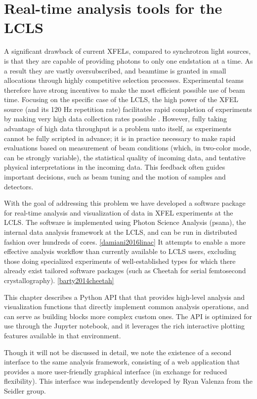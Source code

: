 \chapter{Real-time analysis tools for the LCLS}
\label{xap}

A significant drawback of current XFELs, compared to synchrotron light sources, is that they are capable of providing photons to only one endstation at a time. As a result they are vastly oversubscribed, and beamtime is granted in small allocations through highly competitive selection processes. Experimental teams therefore have strong incentives to make the most efficient possible use of beam time. Focusing on the specific case of the LCLS, the high power of the XFEL source (and its 120 Hz repetition rate) facilitates rapid completion of experiments by making very high data collection rates possible . However, fully taking advantage of high data throughput is a problem unto itself, as experiments cannot be fully scripted in advance; it is in practice necessary to make rapid evaluations based on measurement of beam conditions (which, in two-color mode, can be strongly variable), the statistical quality of incoming data, and tentative physical interpretations in the incoming data. This feedback often guides important decisions, such as beam tuning and the motion of samples and detectors. 

With the goal of addressing this problem we have developed a software package for real-time analysis and visualization of data in XFEL experiments at the LCLS. The software is implemented using Photon Science Analysis (psana), the internal data analysis framework at the LCLS, and can be run in distributed fashion over hundreds of cores. \ref{damiani2016linac} It attempts to enable a more effective analysis workflow than currently available to LCLS users, excluding those doing specialized experiments of well-established types for which there already exist tailored software packages (such as Cheetah for serial femtosecond crystallography). \ref{barty2014cheetah}

This chapter describes a Python API that that provides high-level analysis and visualization functions that directly implement common analysis operations, and can serve as building blocks more complex custom ones. The API is optimized for use through the Jupyter notebook, and it leverages the rich interactive plotting features available in that environment.

Though it will not be discussed in detail, we note the existence of a second interface to the same analysis framework, consisting of a web application that provides a more user-friendly graphical interface (in exchange for reduced flexibility). This interface was independently developed by Ryan Valenza from the Seidler group.



